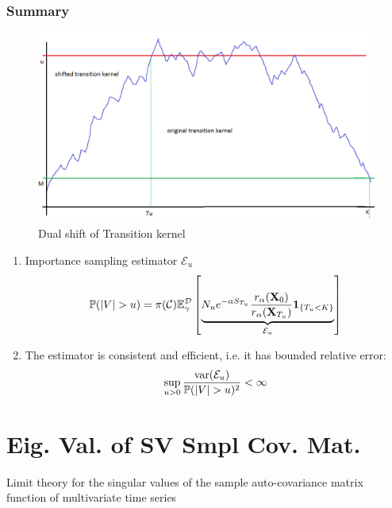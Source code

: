 \documentclass{beamer}
\begin{document}
\begin{frame}
  \frametitle{Summary}
  \begin{minipage}[t]{0.4\linewidth}
    \begin{figure}
      \centering
      \includegraphics[width=1.0\linewidth]{pic1.png}
      \caption{\footnotesize Dual shift of Transition kernel}
    \end{figure}
  \end{minipage}\hfill
  \begin{minipage}[t]{0.6\linewidth}
    \begin{scriptsize}
      \begin{enumerate}
      \item Importance sampling estimator $\mathcal E_u$
        \[
        \mathbb{P}(|V| > u)
        =
        \pi(\mathcal C) \mathbb{E}_\gamma^{\mathcal D} \left[
          \underbrace{
            N_u e^{-\alpha S_{T_u}} {r_\alpha(\mathbf{X}_0) \over r_\alpha(\mathbf{X}_{T_u})} \mathbf{1}_{\{T_u < K\}}
          }_{\mathcal E_u}
        \right]
        \]
      \item The estimator is consistent and efficient, i.e. it has bounded relative error:
        \[
        \sup_{u > 0} {
          \text{var}(\mathcal E_u)
          \over
          \mathbb{P}(|V| > u)^2
        } < \infty
        \]
      \end{enumerate}
    \end{scriptsize}
  \end{minipage}
\end{frame}

\section{Eig. Val. of SV Smpl Cov. Mat.}
\begin{frame}
  Limit theory for the singular values of the sample auto-covariance
  matrix function of multivariate time series
\end{frame}
\end{document}
